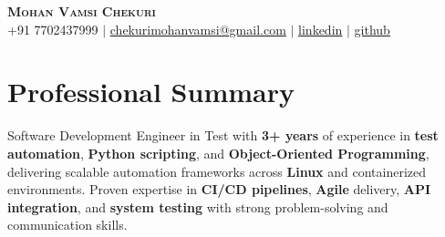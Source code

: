 \documentclass[letterpaper,11pt]{article}
\begin{document}
\begin{center}
    \textbf{\Huge \scshape Mohan Vamsi Chekuri} \\ \vspace{1pt}
    \small +91 7702437999 $|$ \href{mailto:chekurimohanvamsi@gmail.com}{\underline{chekurimohanvamsi@gmail.com}} $|$
    \href{https://www.linkedin.com/in/mvamsi73}{\underline{linkedin}} $|$
    \href{https://github.com}{\underline{github}}
\end{center}

\section{Professional Summary}
Software Development Engineer in Test with \textbf{3+ years} of experience in \textbf{test automation}, \textbf{Python scripting}, and \textbf{Object-Oriented Programming}, delivering scalable automation frameworks across \textbf{Linux} and containerized environments. Proven expertise in \textbf{CI/CD pipelines}, \textbf{Agile} delivery, \textbf{API integration}, and \textbf{system testing} with strong problem-solving and communication skills.
\end{document}
